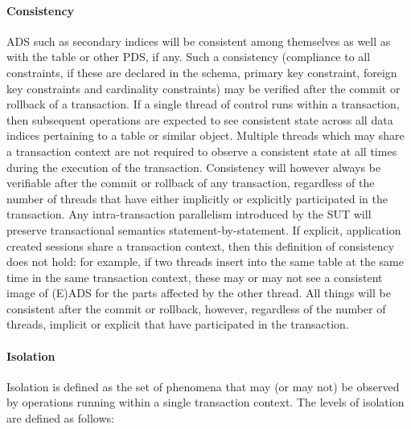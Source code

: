 \paragraph{Consistency}
ADS such as secondary indices will be consistent among themselves as well as with the table or other PDS, if any. Such a consistency (compliance to all constraints, if these are declared in the schema, \eg primary key constraint, foreign key constraints and cardinality constraints) may be verified
after the commit or rollback of a transaction. If a single thread of control runs within a transaction, then
subsequent operations are expected to see consistent state across all data indices pertaining to a table
or similar object. Multiple threads which may share a transaction context are not required to observe a
consistent state at all times during the execution of the transaction. Consistency will however always be
verifiable after the commit or rollback of any transaction, regardless of the number of threads that have
either implicitly or explicitly participated in the transaction. Any intra-transaction parallelism introduced
by the SUT will preserve transactional semantics statement-by-statement. If explicit, application created
sessions share a transaction context, then this definition of consistency does not hold: for example, if
two threads insert into the same table at the same time in the same transaction context, these may or may
not see a consistent image of (E)ADS for the parts affected by the other thread. All things will be
consistent after the commit or rollback, however, regardless of the number of threads, implicit or explicit
that have participated in the transaction.


\paragraph{Isolation}
Isolation is defined as the set of phenomena that may (or may not) be observed by operations running within a single transaction context. The levels of isolation are defined as follows:


